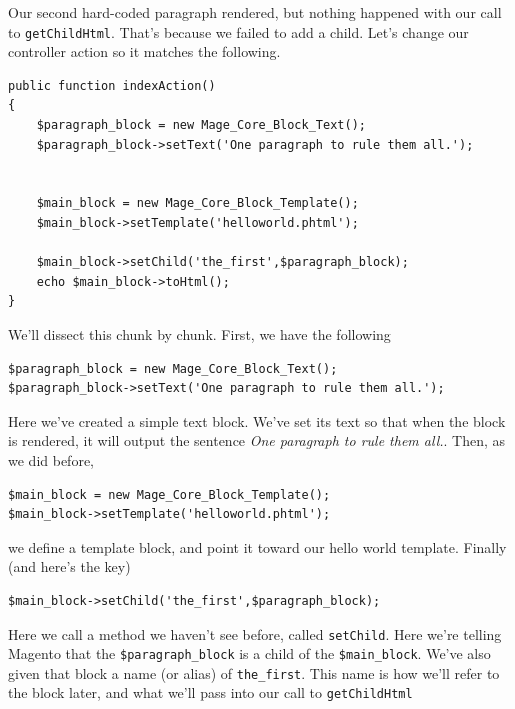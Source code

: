 \documentclass[oneside]{book}
\begin{document}
Our second hard-coded paragraph rendered, but nothing happened with our call to \footnotesize\texttt{getChildHtml}\normalsize.  That's because we failed to add a child.  Let's change our controller action so it matches the following.

\begin{lstlisting}
public function indexAction()
{
    $paragraph_block = new Mage_Core_Block_Text();
    $paragraph_block->setText('One paragraph to rule them all.');


    $main_block = new Mage_Core_Block_Template();
    $main_block->setTemplate('helloworld.phtml');

    $main_block->setChild('the_first',$paragraph_block);
    echo $main_block->toHtml();
}

\end{lstlisting}


We'll dissect this chunk by chunk.  First, we have the following

\begin{lstlisting}
$paragraph_block = new Mage_Core_Block_Text();
$paragraph_block->setText('One paragraph to rule them all.');

\end{lstlisting}


Here we've created a simple text block.  We've set its text so that when the block is rendered, it will output the sentence \emph{One paragraph to rule them all.}.  Then, as we did before,

\begin{lstlisting}
$main_block = new Mage_Core_Block_Template();
$main_block->setTemplate('helloworld.phtml');

\end{lstlisting}


we define a template block, and point it toward our hello world template.  Finally (and here's the key)

\begin{lstlisting}
$main_block->setChild('the_first',$paragraph_block);

\end{lstlisting}


Here we call a method we haven't see before, called \footnotesize\texttt{setChild}\normalsize.  Here we're telling Magento that the \footnotesize\texttt{\$paragraph\_block} \normalsize  is a child of the \footnotesize\texttt{\$main\_block}\normalsize.  We've also given that block a name (or alias) of \footnotesize\texttt{the\_first}\normalsize.  This name is how we'll refer to the block later, and what we'll pass into our call to \footnotesize\texttt{getChildHtml} \normalsize
\end{document}
